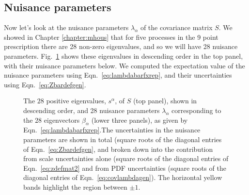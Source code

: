 \subsection{Nuisance parameters}
Now let's look at the nuisance parameters $\lambda_\alpha$ of the covariance matrix $S$. We showed in Chapter \ref{chapter:mhous} that for five processes in the 9 point prescription there are 28 non-zero eigenvalues, and so we will have 28 nuisance parameters. Fig.~\ref{fig:nuisancediag} shows these eigenvalues in descending order in the top panel, with their nuisance parameters below. We computed the expectation value of the nuisance parameters using Eqn.~\ref{eq:lambdabarfxrep}, and their uncertainties using Eqn.~\ref{eq:Zbardefgen}. 
  \begin{figure}[t]
    \begin{center}
    \end{center}
  \vspace{-0.55cm}
  \caption{The $28$ positive eigenvalues, $s^\alpha$, of $S$ (top panel), shown in descending order, and 28 nuisance parameters $\lambda_\alpha$ corresponding to the $28$ eigenvectors $\beta_\alpha$ (lower three panels), as given by Eqn.~\ref{eq:lambdabarfxrep}.The uncertainties in the nuisance parameters are shown in total (square roots of the diagonal entries of Eqn.~\ref{eq:Zbardefgen}, and broken down into the contribution from scale uncertainties alone (square roots of the diagonal entries of Eqn.~\ref{eq:zdefmat2}  and from PDF uncertainties (square roots of the diagonal entries of Eqn.~\ref{eq:covlambdagen}). The horizontal yellow bands highlight the region between $\pm 1$.}
  \label{fig:nuisancediag}
\end{figure}

